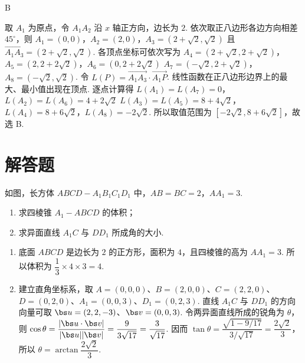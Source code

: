 \begin{answer}
B
\end{answer}

\begin{solution}
取 \(A_1\) 为原点，令 \(A_1A_2\) 沿 \(x\) 轴正方向，边长为 \(2\). 依次取正八边形各边方向相差 \(45^\circ\)，则
\(A_1=(0,0)\)，\(A_2=(2,0)\)，\(A_3=(2+\sqrt2,\sqrt2)\)
且 \(\overrightarrow{A_1A_3}=(2+\sqrt2,\sqrt2)\). 各顶点坐标可依次写为
\(A_4=(2+\sqrt2,2+\sqrt2)\)，\(A_5=(2,2+2\sqrt2)\)，\(A_6=(0,2+2\sqrt2)\)
\(A_7=(-\sqrt2,2+\sqrt2)\)，\(A_8=(-\sqrt2,\sqrt2)\).
令 \(L(P)=\overrightarrow{A_1A_3}\cdot\overrightarrow{A_1P}\). 线性函数在正八边形边界上的最大、最小值出现在顶点. 逐点计算得
\(L(A_1)=L(A_7)=0\)，\(L(A_2)=L(A_6)=4+2\sqrt2\)
\(L(A_3)=L(A_5)=8+4\sqrt2\)，\(L(A_4)=8+6\sqrt2\)，\(L(A_8)=-2\sqrt2\).
所以取值范围为 \([-2\sqrt2,8+6\sqrt2]\)，故选 B.
\end{solution}

\section{解答题}

\begin{problem}
如图，长方体 \(ABCD-A_1B_1C_1D_1\) 中，\(AB=BC=2\)，\(AA_1=3\).

\begin{enumerate}
\item 求四棱锥 \(A_1-ABCD\) 的体积；
\item 求异面直线 \(A_1C\) 与 \(DD_1\) 所成角的大小.
\end{enumerate}

\end{problem}

\begin{solution}
\begin{enumerate}
\item 底面 \(ABCD\) 是边长为 \(2\) 的正方形，面积为 \(4\)，且四棱锥的高为 \(AA_1=3\). 所以体积为 \(\dfrac13\times4\times3=4\).
\item 建立直角坐标系，取 \(A=(0,0,0)\)、\(B=(2,0,0)\)、\(C=(2,2,0)\)、\(D=(0,2,0)\)、\(A_1=(0,0,3)\)、\(D_1=(0,2,3)\). 直线 \(A_1C\) 与 \(DD_1\) 的方向向量可取 \(\bs u=(2,2,-3)\)、\(\bs v=(0,0,3)\). 令两异面直线所成的锐角为 \(\theta\)，则 \(\cos\theta=\dfrac{|\bs u\cdot\bs v|}{|\bs u||\bs v|}=\dfrac9{3\sqrt{17}}=\dfrac3{\sqrt{17}}\). 因而 \(\tan\theta=\dfrac{\sqrt{1-9/17}}{3/\sqrt{17}}=\dfrac{2\sqrt2}{3}\)，所以 \(\theta=\arctan\dfrac{2\sqrt2}{3}\).
\end{enumerate}
\end{solution}


